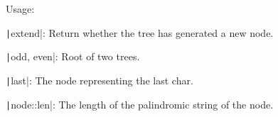 Usage:
\begin{compactenum}
\item \texttt|extend|: Return whether the tree has generated a new node.
\item \texttt|odd, even|: Root of two trees.
\item \texttt|last|: The node representing the last char.
\item \texttt|node::len|: The length of the palindromic string of the node.
\end{compactenum}
\inputminted{cpp}{src/string/palindrome/palindromic-tree.cpp.com}

